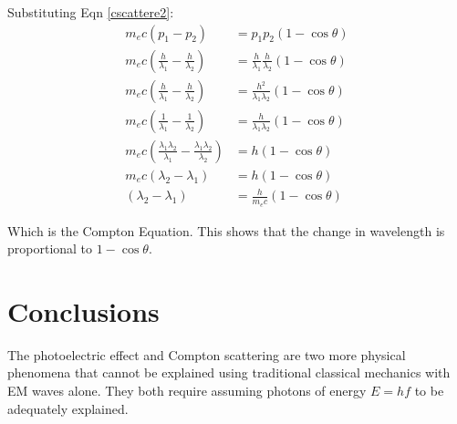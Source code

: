 Substituting Eqn \ref{cscattere2}:
\begin{align*}
    m_ec(p_1 - p_2) &= p_1p_2 (1 - \cos \theta)\\
    m_ec\left(\frac{h}{\lambda_1} - \frac{h}{\lambda_2}\right) &= \frac{h}{\lambda_1} \frac{h}{\lambda_2} (1 - \cos \theta)\\
    m_ec\left(\frac{h}{\lambda_1} - \frac{h}{\lambda_2}\right) &= \frac{h^2}{\lambda_1 \lambda_2} (1 - \cos \theta)\\
    m_ec\left(\frac{1}{\lambda_1} - \frac{1}{\lambda_2}\right) &= \frac{h}{\lambda_1 \lambda_2} (1 - \cos \theta)\\
    m_ec\left(\frac{\lambda_1 \lambda_2}{\lambda_1} - \frac{\lambda_1 \lambda_2}{\lambda_2}\right) &= h (1 - \cos \theta)\\
    m_ec\left(\lambda_2 - \lambda_1\right) &= h (1 - \cos \theta)\\
    \left(\lambda_2 - \lambda_1\right) &= \frac{h}{m_ec} (1 - \cos \theta)
\end{align*}

Which is the Compton Equation. This shows that the change in wavelength is proportional to $1 - \cos \theta$.

\section*{Conclusions}
The photoelectric effect and Compton scattering are two more physical phenomena that cannot be explained using traditional classical mechanics with EM waves alone. They both require assuming photons of energy $E = hf$ to be adequately explained.